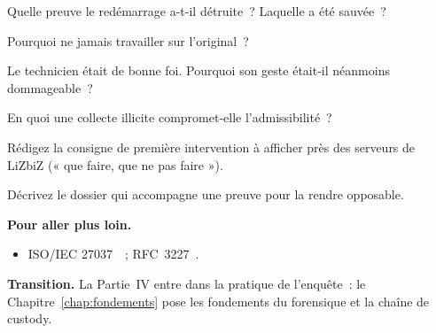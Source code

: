 \begin{boxexo}[title={\ding{45}\quad Exercice~10.5. FARO \niveaumoyen}]
Quelle preuve le redémarrage a-t-il détruite~? Laquelle a été sauvée~?
\end{boxexo}

\begin{boxexo}[title={\ding{45}\quad Exercice~10.6. L'original \niveaumoyen}]
Pourquoi ne jamais travailler sur l'original~?
\end{boxexo}

\begin{boxexo}[title={\ding{45}\quad Exercice~10.7. Bonne foi \niveaumoyen}]
Le technicien était de bonne foi. Pourquoi son geste était-il néanmoins
dommageable~?
\end{boxexo}

\begin{boxexo}[title={\ding{45}\quad Exercice~10.8. Licéité \niveaumoyen}]
En quoi une collecte illicite compromet-elle l'admissibilité~?
\end{boxexo}

\begin{boxexo}[title={\ding{45}\quad Exercice~10.9. Note de première intervention \niveauexpert}]
Rédigez la consigne de première intervention à afficher près des serveurs de
LiZbiZ (« que faire, que ne pas faire »).
\end{boxexo}

\begin{boxexo}[title={\ding{45}\quad Exercice~10.10. Dossier de preuve \niveauexpert}]
Décrivez le dossier qui accompagne une preuve pour la rendre opposable.
\end{boxexo}

\bigskip

\begin{boxinfo}
\textbf{Pour aller plus loin.}
\begin{itemize}
    \item ISO/IEC 27037~\cite{iso27037}~; RFC~3227~\cite{rfc3227}.
\end{itemize}
\end{boxinfo}

\begin{boxinfo}
\textbf{Transition.} La Partie~IV entre dans la pratique de l'enquête~: le
Chapitre~\ref{chap:fondements} pose les fondements du forensique et la chaîne
de custody.
\end{boxinfo}

